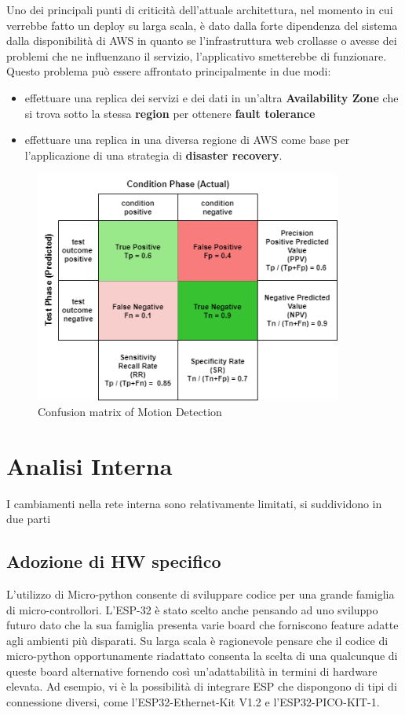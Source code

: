 Uno dei principali punti di criticità dell'attuale architettura, nel momento in cui verrebbe fatto un deploy su larga scala, è dato dalla forte dipendenza del sistema dalla disponibilità di AWS in quanto se l'infrastruttura web crollasse o avesse dei problemi che ne influenzano il servizio, l'applicativo smetterebbe di funzionare. 
 Questo problema può essere affrontato principalmente in due modi:
\begin{itemize}
    \item  effettuare una replica dei servizi e dei dati in un'altra\textbf{ Availability Zone} che si trova sotto la stessa \textbf{region} per ottenere \textbf{fault tolerance}
    \item  effettuare una replica in una diversa regione di AWS come base per l'applicazione di una strategia di \textbf{disaster recovery}. 
\end{itemize}

    \begin{figure}[H]
        \caption{Confusion matrix of Motion Detection}
        \label{fig:Hello}
        \centering
        \includegraphics[width=0.9\textwidth]{DrawIo/ConfusionMatrixMotDet.png}
    \end{figure}
 

\section{Analisi Interna}
    I cambiamenti nella rete interna sono relativamente limitati, si suddividono in due parti
    \subsection{Adozione di HW specifico}
    L'utilizzo di Micro-python consente di sviluppare codice per una grande famiglia di micro-controllori. L'ESP-32 è stato scelto anche pensando ad uno sviluppo futuro dato che la sua famiglia presenta varie board che forniscono feature adatte agli ambienti più disparati. Su larga scala è ragionevole pensare che il codice di micro-python opportunamente riadattato consenta la scelta di una qualcunque di queste board alternative fornendo così un'adattabilità in termini di hardware elevata. Ad esempio, vi è la possibilità di integrare ESP che dispongono di tipi di connessione diversi, come l'ESP32-Ethernet-Kit V1.2 e l'ESP32-PICO-KIT-1.
    
